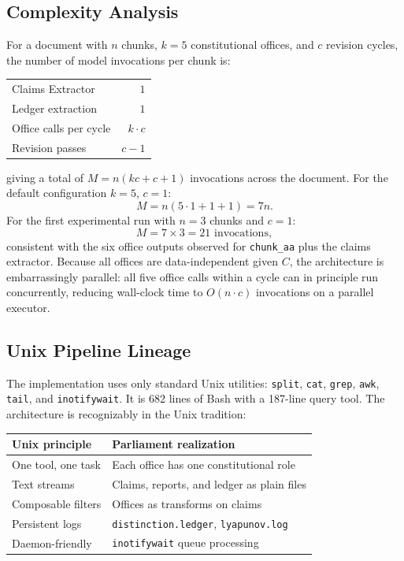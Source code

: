 \documentclass[12pt, a4paper]{article}
\theoremstyle{principle}
\theoremstyle{definition}
\begin{document}
\subsection{Complexity Analysis}

For a document with $n$ chunks, $k = 5$ constitutional offices, and $c$ revision
cycles, the number of model invocations per chunk is:
\begin{center}
\begin{tabular}{lr}
Claims Extractor & $1$ \\
Ledger extraction & $1$ \\
Office calls per cycle & $k \cdot c$ \\
Revision passes & $c - 1$ \\
\end{tabular}
\end{center}
giving a total of $M = n(kc + c + 1)$ invocations across the document. For the
default configuration $k = 5$, $c = 1$:
\[
M = n(5 \cdot 1 + 1 + 1) = 7n.
\]
For the first experimental run with $n = 3$ chunks and $c = 1$:
\[
M = 7 \times 3 = 21 \text{ invocations},
\]
consistent with the six office outputs observed for \texttt{chunk\_aa} plus the
claims extractor. Because all offices are data-independent given $C$, the
architecture is embarrassingly parallel: all five office calls within a cycle can
in principle run concurrently, reducing wall-clock time to
$O(n \cdot c)$ invocations on a parallel executor.

\subsection{Unix Pipeline Lineage}

The implementation uses only standard Unix utilities: \texttt{split},
\texttt{cat}, \texttt{grep}, \texttt{awk}, \texttt{tail}, and
\texttt{inotifywait}. It is 682 lines of Bash with a 187-line query tool.
The architecture is recognizably in the Unix tradition:

\begin{center}
\begin{tabular}{ll}
\toprule
Unix principle & Parliament realization \\
\midrule
One tool, one task & Each office has one constitutional role \\
Text streams & Claims, reports, and ledger as plain files \\
Composable filters & Offices as transforms on claims \\
Persistent logs & \texttt{distinction.ledger}, \texttt{lyapunov.log} \\
Daemon-friendly & \texttt{inotifywait} queue processing \\
\bottomrule
\end{tabular}
\end{center}
\end{document}
